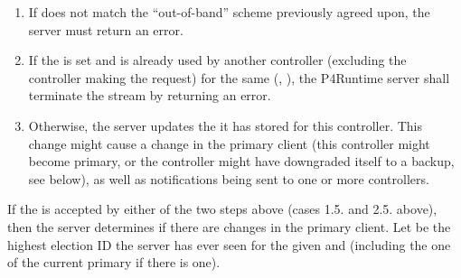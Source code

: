 \documentclass[11pt]{article}
\begin{document}
{\begin{enumerate}
\begin{enumerate}
\item{}
If  does not match the \textquotedblleft{}out-of-band\textquotedblright{} scheme previously
agreed upon, the server must return an  error.%

\item{}
If the  is set and is already used by another controller
(excluding the controller making the request) for the same
(, ), the P4Runtime server shall terminate the stream
by returning an  error.%

\item{}
Otherwise, the server updates the  it has stored for this
controller. This change might cause a change in the primary client (this
controller might become primary, or the controller might have downgraded
itself to a backup, see below), as well as notifications being sent to
one or more controllers.%
\end{enumerate}%
\end{enumerate}%

\noindent{}If the  is accepted by either of the two steps above
(cases 1.5. and 2.5. above), then the server determines if there are changes in
the primary client. Let  be the highest election ID the server
has ever seen for the given  and  (including the one of the
current primary if there is one).%

}
\end{document}

